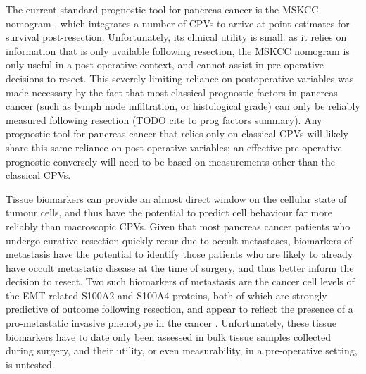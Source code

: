 \documentclass[dissertation.tex]{subfiles}
\begin{document}
The current standard prognostic tool for pancreas cancer is the \gls{MSKCC} nomogram \cite{Brennan2004}, which integrates a number of \glspl{CPV} to arrive at point estimates for survival post-resection.  Unfortunately, its clinical utility is small: as it relies on information that is only available following resection, the \gls{MSKCC} nomogram is only useful in a post-operative context, and cannot assist in pre-operative decisions to resect.  This severely limiting reliance on postoperative variables was made necessary by the fact that most classical prognostic factors in pancreas cancer (such as lymph node infiltration, or histological grade) can only be reliably measured following resection (TODO cite to prog factors summary).  Any prognostic tool for pancreas cancer that relies only on classical \glspl{CPV} will likely share this same reliance on post-operative variables; an effective pre-operative prognostic conversely will need to be based on measurements other than the classical \glspl{CPV}.

Tissue biomarkers can provide an almost direct window on the cellular state of tumour cells, and thus have the potential to predict cell behaviour far more reliably than macroscopic \glspl{CPV}.  Given that most pancreas cancer patients who undergo curative resection quickly recur due to occult metastases, biomarkers of metastasis have the potential to identify those patients who are likely to already have occult metastatic disease at the time of surgery, and thus better inform the decision to resect.  Two such biomarkers of metastasis are the cancer cell levels of the \gls{EMT}-related S100A2 and S100A4 proteins, both of which are strongly predictive of outcome following resection, and appear to reflect the presence of a pro-metastatic invasive phenotype in the cancer \cite{Biankin2008, Tsukamoto2013, Lee2014}.  Unfortunately, these tissue biomarkers have to date only been assessed in bulk tissue samples collected during surgery, and their utility, or even measurability, in a pre-operative setting, is untested.
\end{document}
